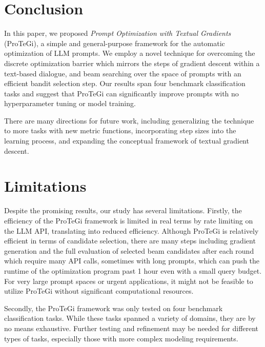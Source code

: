 \section{Conclusion}
In this paper, we proposed \emph{Prompt Optimization with Textual Gradients} (ProTeGi), a simple and general-purpose framework for the automatic optimization of LLM prompts. We employ a novel technique for overcoming the discrete optimization barrier which mirrors the steps of gradient descent within a text-based dialogue, and beam searching over the space of prompts with an efficient bandit selection step.  Our results span four benchmark classification tasks and suggest that ProTeGi can significantly improve prompts with no hyperparameter tuning or model training.

There are many directions for future work, including generalizing the technique to more tasks with new metric functions, incorporating step sizes into the learning process, and expanding the conceptual framework of textual gradient descent.

\section*{Limitations}
Despite the promising results, our study has several limitations. Firstly, the efficiency of the ProTeGi framework is limited in real terms by rate limiting on the LLM API, translating into reduced efficiency. Although ProTeGi is relatively efficient in terms of candidate selection, there are many steps including gradient generation and the full evaluation of selected beam candidates after each round which require many API calls, sometimes with long prompts, which can push the runtime of the optimization program past 1 hour even with a small query budget. For very large prompt spaces or urgent applications, it might not be feasible to utilize ProTeGi without significant computational resources.

Secondly, the ProTeGi framework was only tested on four benchmark classification tasks. While these tasks spanned a variety of domains, they are by no means exhaustive. Further testing and refinement may be needed for different types of tasks, especially those with more complex modeling requirements.

